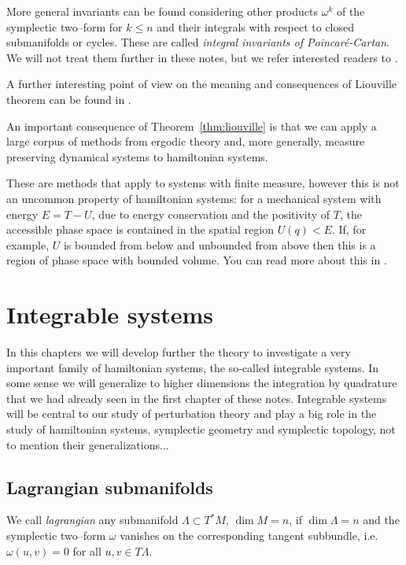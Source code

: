 \documentclass[english,fontsize=11pt,paper=a5,oneside]{scrbook}
\theoremstyle{definition}
\begin{document}
More general invariants can be found considering other products $\omega^k$ of the symplectic two--form for $k\leq n$ and their integrals with respect to closed submanifolds or cycles.
These are called \emph{integral invariants of Poincar\'e-Cartan}. We will not treat them further in these notes, but we refer interested readers to \cite[Chapter 9.44]{book:arnold}.

A further interesting point of view on the meaning and consequences of Liouville theorem can be found in \cite[Chapters 4.2.1-4.2.2]{lectures:tong}.

An important consequence of Theorem~\ref{thm:liouville} is that we can apply a large corpus of methods from ergodic theory and, more generally, measure preserving dynamical systems to hamiltonian systems.

These are methods that apply to systems with finite measure, however this is not an uncommon property of hamiltonian systems: for a mechanical system with energy $E = T- U$, due to energy conservation and the positivity of $T$, the accessible phase space is contained in the spatial region $U(q) < E$. If, for example, $U$ is bounded from below and unbounded from above then this is a region of phase space with bounded volume.
You can read more about this in \cite[Chapter 3.16.C-D]{book:arnold}.

\chapter{Integrable systems}

In this chapters we will develop further the theory to investigate a very important family of hamiltonian systems, the so-called integrable systems.
In some sense we will generalize to higher dimensions the integration by quadrature that we had already seen in the first chapter of these notes.
Integrable systems will be central to our study of perturbation theory and play a big role in the study of hamiltonian systems, symplectic geometry and symplectic topology, not to mention their generalizations...

\section{Lagrangian submanifolds}

\begin{tcolorbox}
    We call \emph{lagrangian} any submanifold $\Lambda \subset T^*M$, $\dim M = n$, if $\dim \Lambda = n$ and the symplectic two--form $\omega$ vanishes on the corresponding tangent subbundle, i.e. $\omega(u,v) = 0$ for all $u,v \in T\Lambda$.
\end{tcolorbox}
\end{document}
